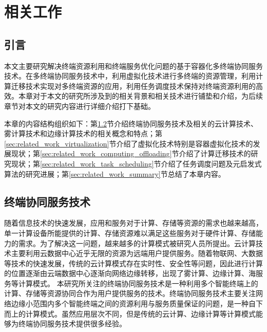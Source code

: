 \chapter{相关工作 }\label{chap:related_work}

\section{引言}
本文主要研究解决终端资源利用和终端服务优化问题的基于容器化多终端协同服务技术。在多终端协同服务技术中，利用虚拟化技术进行多终端的资源管理，利用计算迁移技术实现对多终端资源的应用，利用任务调度技术保持对终端资源利用的高效。本章对于本文的研究所涉及到的相关背景和相关技术进行铺垫和介绍，为后续章节对本文的研究内容进行详细介绍打下基础。

本章的内容结构组织如下：第\ref{sec:related_work_cloud_computing}节介绍终端协同服务技术及相关的云计算技术、雾计算技术和边缘计算技术的相关概念和特点；第\ref{sec:related_work_virtualization}节介绍了虚拟化技术特别是容器虚拟化技术的发展现状；第\ref{sec:related_work_computing_offloading}节介绍了计算迁移技术的研究现状；第\ref{sec:related_work_task_scheduling}节介绍了任务调度问题及元启发式算法的研究进展；第\ref{sec:related_work_summary}节总结了本章内容。

\section{终端协同服务技术}\label{sec:related_work_cloud_computing}
随着信息技术的快速发展，应用和服务对于计算、存储等资源的需求也越来越高，单一计算设备所能提供的计算、存储资源难以满足这些服务对于硬件计算、存储能力的需求。为了解决这一问题，越来越多的计算模式被研究人员所提出。云计算技术主要利用云数据中心近乎无限的资源为远端用户提供服务。随着物联网、大数据等技术的快速发展，传统的云计算模式存在实时性、安全性等问题，因此进行计算的位置逐渐由云端数据中心逐渐向网络边缘转移，出现了雾计算、边缘计算、海服务等计算模式。
本研究所关注的终端协同服务技术是一种利用多个智能终端上的计算、存储等资源协同合作为用户提供服务的技术。终端协同服务技术主要关注网络边缘小范围内多个智能终端之间的资源利用与服务质量保证的问题，是一种自下而上的计算模式。虽然应用层次不同，但是传统的云计算、边缘计算等计算模式能够为终端协同服务技术提供很多经验。

